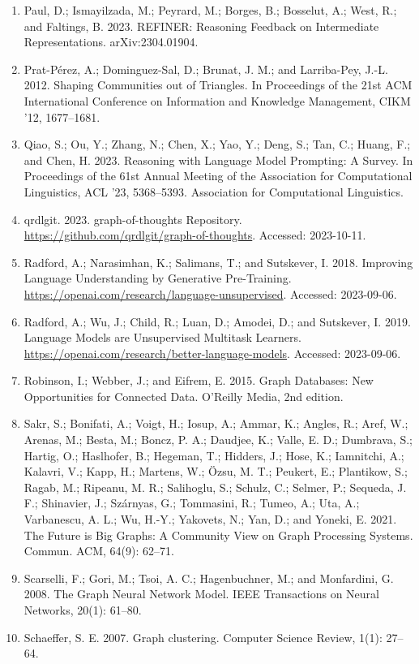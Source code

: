\documentclass[11pt,UTF8,fontset=fandol]{ctexart}
\begin{document}
\begin{enumerate}[leftmargin=2em]
\item Paul, D.; Ismayilzada, M.; Peyrard, M.; Borges, B.; Bosselut, A.; West, R.; and Faltings, B. 2023. REFINER: Reasoning Feedback on Intermediate Representations. arXiv:2304.01904.
\item Prat-Pérez, A.; Dominguez-Sal, D.; Brunat, J. M.; and Larriba-Pey, J.-L. 2012. Shaping Communities out of Triangles. In Proceedings of the 21st ACM International Conference on Information and Knowledge Management, CIKM '12, 1677--1681.
\item Qiao, S.; Ou, Y.; Zhang, N.; Chen, X.; Yao, Y.; Deng, S.; Tan, C.; Huang, F.; and Chen, H. 2023. Reasoning with Language Model Prompting: A Survey. In Proceedings of the 61st Annual Meeting of the Association for Computational Linguistics, ACL '23, 5368--5393. Association for Computational Linguistics.
\item qrdlgit. 2023. graph-of-thoughts Repository. \url{https://github.com/qrdlgit/graph-of-thoughts}. Accessed: 2023-10-11.
\item Radford, A.; Narasimhan, K.; Salimans, T.; and Sutskever, I. 2018. Improving Language Understanding by Generative Pre-Training. \url{https://openai.com/research/language-unsupervised}. Accessed: 2023-09-06.
\item Radford, A.; Wu, J.; Child, R.; Luan, D.; Amodei, D.; and Sutskever, I. 2019. Language Models are Unsupervised Multitask Learners. \url{https://openai.com/research/better-language-models}. Accessed: 2023-09-06.
\item Robinson, I.; Webber, J.; and Eifrem, E. 2015. Graph Databases: New Opportunities for Connected Data. O'Reilly Media, 2nd edition.
\item Sakr, S.; Bonifati, A.; Voigt, H.; Iosup, A.; Ammar, K.; Angles, R.; Aref, W.; Arenas, M.; Besta, M.; Boncz, P. A.; Daudjee, K.; Valle, E. D.; Dumbrava, S.; Hartig, O.; Haslhofer, B.; Hegeman, T.; Hidders, J.; Hose, K.; Iamnitchi, A.; Kalavri, V.; Kapp, H.; Martens, W.; Özsu, M. T.; Peukert, E.; Plantikow, S.; Ragab, M.; Ripeanu, M. R.; Salihoglu, S.; Schulz, C.; Selmer, P.; Sequeda, J. F.; Shinavier, J.; Szárnyas, G.; Tommasini, R.; Tumeo, A.; Uta, A.; Varbanescu, A. L.; Wu, H.-Y.; Yakovets, N.; Yan, D.; and Yoneki, E. 2021. The Future is Big Graphs: A Community View on Graph Processing Systems. Commun. ACM, 64(9): 62--71.
\item Scarselli, F.; Gori, M.; Tsoi, A. C.; Hagenbuchner, M.; and Monfardini, G. 2008. The Graph Neural Network Model. IEEE Transactions on Neural Networks, 20(1): 61--80.
\item Schaeffer, S. E. 2007. Graph clustering. Computer Science Review, 1(1): 27--64.

\end{enumerate}
\end{document}
